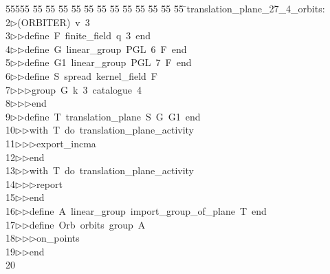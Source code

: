 %
%
\begin{tabbing}
55555 \= 55 \= 55 \= 55 \= 55 \= 55 \= 55 \= 55 \= 55 \= 55 \= 55 \= 55 \= 55 \= \>translation\_plane\_27\_4\_orbits:\\[0pt]
2\>$\triangleright$\>(ORBITER)\ v\ 3\ \\[0pt]
3\>$\triangleright$\>$\triangleright$\>define\ F\ finite\_field\ q\ 3\ end\ \\[0pt]
4\>$\triangleright$\>$\triangleright$\>define\ G\ linear\_group\ PGL\ 6\ F\ end\ \\[0pt]
5\>$\triangleright$\>$\triangleright$\>define\ G1\ linear\_group\ PGL\ 7\ F\ end\ \\[0pt]
6\>$\triangleright$\>$\triangleright$\>define\ S\ spread\ kernel\_field\ F\ \\[0pt]
7\>$\triangleright$\>$\triangleright$\>$\triangleright$\>group\ G\ k\ 3\ catalogue\ 4\ \\[0pt]
8\>$\triangleright$\>$\triangleright$\>$\triangleright$\>end\ \\[0pt]
9\>$\triangleright$\>$\triangleright$\>define\ T\ translation\_plane\ S\ G\ G1\ end\ \\[0pt]
10\>$\triangleright$\>$\triangleright$\>with\ T\ do\ translation\_plane\_activity\ \\[0pt]
11\>$\triangleright$\>$\triangleright$\>$\triangleright$\>export\_incma\ \\[0pt]
12\>$\triangleright$\>$\triangleright$\>end\ \\[0pt]
13\>$\triangleright$\>$\triangleright$\>with\ T\ do\ translation\_plane\_activity\ \\[0pt]
14\>$\triangleright$\>$\triangleright$\>$\triangleright$\>report\ \\[0pt]
15\>$\triangleright$\>$\triangleright$\>end\ \\[0pt]
16\>$\triangleright$\>$\triangleright$\>define\ A\ linear\_group\ import\_group\_of\_plane\ T\ end\ \\[0pt]
17\>$\triangleright$\>$\triangleright$\>define\ Orb\ orbits\ group\ A\ \\[0pt]
18\>$\triangleright$\>$\triangleright$\>$\triangleright$\>on\_points\ \\[0pt]
19\>$\triangleright$\>$\triangleright$\>end\\[0pt]
20\>\end{tabbing}
